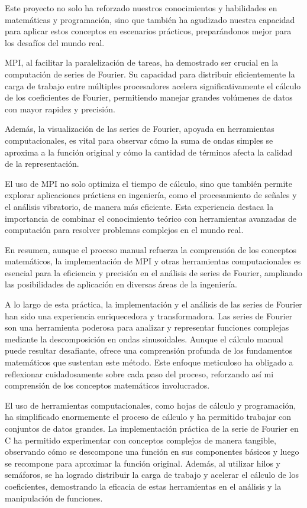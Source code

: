 Este proyecto no solo ha reforzado nuestros conocimientos y habilidades en matemáticas y programación, sino que también ha agudizado nuestra capacidad para aplicar estos conceptos en escenarios prácticos, preparándonos mejor para los desafíos del mundo real.

MPI, al facilitar la paralelización de tareas, ha demostrado ser crucial en la computación de series de Fourier. Su capacidad para distribuir eficientemente la carga de trabajo entre múltiples procesadores acelera significativamente el cálculo de los coeficientes de Fourier, permitiendo manejar grandes volúmenes de datos con mayor rapidez y precisión.

Además, la visualización de las series de Fourier, apoyada en herramientas computacionales, es vital para observar cómo la suma de ondas simples se aproxima a la función original y cómo la cantidad de términos afecta la calidad de la representación. 

El uso de MPI no solo optimiza el tiempo de cálculo, sino que también permite explorar aplicaciones prácticas en ingeniería, como el procesamiento de señales y el análisis vibratorio, de manera más eficiente. Esta experiencia destaca la importancia de combinar el conocimiento teórico con herramientas avanzadas de computación para resolver problemas complejos en el mundo real.

En resumen, aunque el proceso manual refuerza la comprensión de los conceptos matemáticos, la implementación de MPI y otras herramientas computacionales es esencial para la eficiencia y precisión en el análisis de series de Fourier, ampliando las posibilidades de aplicación en diversas áreas de la ingeniería.

A lo largo de esta práctica, la implementación y el análisis de las series de Fourier han sido una experiencia enriquecedora y transformadora. Las series de Fourier son una herramienta poderosa para analizar y representar funciones complejas mediante la descomposición en ondas sinusoidales. Aunque el cálculo manual puede resultar desafiante, ofrece una comprensión profunda de los fundamentos matemáticos que sustentan este método. Este enfoque meticuloso ha obligado a reflexionar cuidadosamente sobre cada paso del proceso, reforzando así mi comprensión de los conceptos matemáticos involucrados.

El uso de herramientas computacionales, como hojas de cálculo y programación, ha simplificado enormemente el proceso de cálculo y ha permitido trabajar con conjuntos de datos grandes. La implementación práctica de la serie de Fourier en C ha permitido experimentar con conceptos complejos de manera tangible, observando cómo se descompone una función en sus componentes básicos y luego se recompone para aproximar la función original. Además, al utilizar hilos y semáforos, se ha logrado distribuir la carga de trabajo y acelerar el cálculo de los coeficientes, demostrando la eficacia de estas herramientas en el análisis y la manipulación de funciones.

